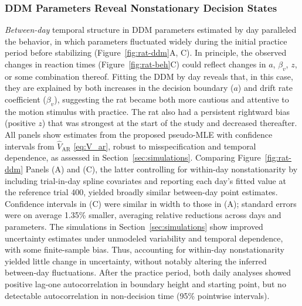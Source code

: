 \documentclass[00-main.tex]{subfiles}
\begin{document}
\subsubsection{DDM Parameters Reveal Nonstationary Decision States}
\emph{Between-day} temporal structure in DDM parameters estimated by day paralleled the behavior, in which parameters fluctuated widely during the initial practice period before stabilizing (Figure~\ref{fig:rat-ddm}A, C). In principle, the observed changes in reaction times (Figure~\ref{fig:rat-beh}C) could reflect changes in $a$, $\beta_v$, $z$, or some combination thereof. Fitting the DDM by day reveals that, in this case, they are explained by both increases in the decision boundary ($a$) and drift rate coefficient ($\beta_v$), suggesting the rat became both more cautious and attentive to the motion stimulus with practice. The rat also had a persistent rightward bias (positive $z$) that was strongest at the start of the study and decreased thereafter. All panels show estimates from the proposed pseudo-MLE with confidence intervals from $\widehat{V}_\text{AR}$ \eqref{eq:V_ar}, robust to misspecification and temporal dependence, as assessed in Section~\ref{sec:simulations}. Comparing Figure~\ref{fig:rat-ddm} Panels (A) and (C), the latter controlling for within-day nonstationarity by including trial-in-day spline covariates and reporting each day's fitted value at the reference trial 400, yielded broadly similar between-day point estimates. Confidence intervals in (C) were similar in width to those in (A); standard errors were on average 1.35\% smaller, averaging relative reductions across days and parameters. The simulations in Section~\ref{sec:simulations} show improved uncertainty estimates under unmodeled variability and temporal dependence, with some finite-sample bias. Thus, accounting for within-day nonstationarity yielded little change in uncertainty, without notably altering the inferred between-day fluctuations. After the practice period, both daily analyses showed positive lag-one autocorrelation in boundary height and starting point, but no detectable autocorrelation in non-decision time (95\% pointwise intervals).
\end{document}
